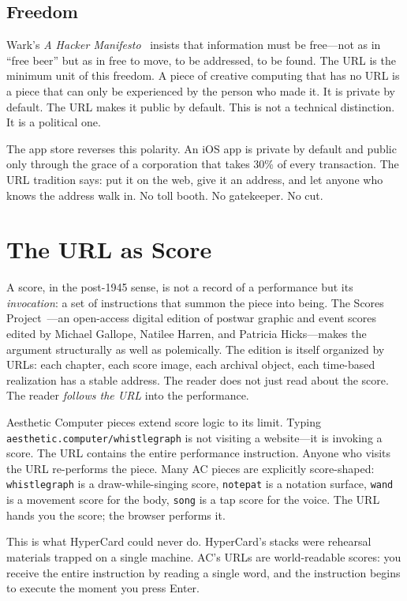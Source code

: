 \documentclass[10pt,letterpaper,twocolumn]{article}
\newcommand{\code}[1]{\texttt{#1}}
\begin{document}
\subsection{Freedom}

Wark's \emph{A Hacker Manifesto}~\citep{wark2004hacker} insists that information must be free---not as in ``free beer'' but as in free to move, to be addressed, to be found. The URL is the minimum unit of this freedom. A piece of creative computing that has no URL is a piece that can only be experienced by the person who made it. It is private by default. The URL makes it public by default. This is not a technical distinction. It is a political one.

The app store reverses this polarity. An iOS app is private by default and public only through the grace of a corporation that takes 30\% of every transaction. The URL tradition says: put it on the web, give it an address, and let anyone who knows the address walk in. No toll booth. No gatekeeper. No cut.

\section{The URL as Score}

A score, in the post-1945 sense, is not a record of a performance but its \emph{invocation}: a set of instructions that summon the piece into being. The Scores Project~\citep{gallope2025scores}---an open-access digital edition of postwar graphic and event scores edited by Michael Gallope, Natilee Harren, and Patricia Hicks---makes the argument structurally as well as polemically. The edition is itself organized by URLs: each chapter, each score image, each archival object, each time-based realization has a stable address. The reader does not just read about the score. The reader \emph{follows the URL} into the performance.

Aesthetic Computer pieces extend score logic to its limit. Typing \code{aesthetic.computer/whistlegraph} is not visiting a website---it is invoking a score. The URL contains the entire performance instruction. Anyone who visits the URL re-performs the piece. Many AC pieces are explicitly score-shaped: \code{whistlegraph} is a draw-while-singing score, \code{notepat} is a notation surface, \code{wand} is a movement score for the body, \code{song} is a tap score for the voice. The URL hands you the score; the browser performs it.

This is what HyperCard could never do. HyperCard's stacks were rehearsal materials trapped on a single machine. AC's URLs are world-readable scores: you receive the entire instruction by reading a single word, and the instruction begins to execute the moment you press Enter.
\end{document}
